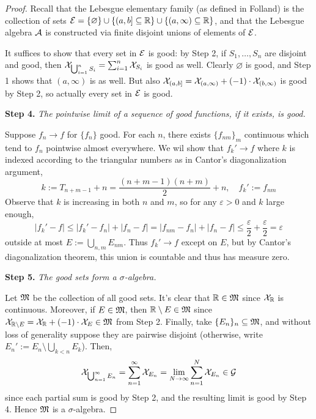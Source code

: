 \begin{proof}
    Recall that the Lebesgue elementary family (as defined in Folland) is the collection of sets \(\mathcal{E} = \{ \varnothing \} \cup \{ (a, b] \subseteq \mathbb{R} \} \cup \{ (a, \infty) \subseteq \mathbb{R} \}\), and that the Lebesgue algebra \(\mathcal{A}\) is constructed via finite disjoint unions of elements of \(\mathcal{E}\). 
    
    It suffices to show that every set in \(\mathcal{E}\) is good: by Step 2, if \(S_1, \dots, S_n\) are disjoint and good, then \(\mathcal{X}_{\bigcup_{i=1}^n S_i} = \sum_{i=1}^n \mathcal{X}_{S_i}\) is good as well. Clearly \(\varnothing\) is good, and Step 1 shows that \((a, \infty)\) is as well. But also \(\mathcal{X}_{(a, b]} = \mathcal{X}_{(a, \infty)} + (-1) \cdot \mathcal{X}_{(b, \infty)}\) is good by Step 2, so actually every set in \(\mathcal{E}\) is good. 

    \textbf{Step 4.} \emph{The pointwise limit of a sequence of good functions, if it exists, is good.}

    Suppose \(f_n \to f\) for \(\{f_n\}\) good. For each \(n\), there exists \(\{f_{nm}\}_m\) continuous which tend to \(f_n\) pointwise almost everywhere. We wil show that \(f_k' \to f\) where \(k\) is indexed according to the triangular numbers as in Cantor's diagonalization argument, 
    \[
    k := T_{n+m-1} + n = \frac{(n+m-1)(n+m)}{2} + n, 
    \quad 
    f_k' := f_{nm}
    \]
    Observe that \(k\) is increasing in both \(n\) and \(m\), so for any \(\varepsilon > 0\) and \(k\) large enough, 
    \[
    |f_k' - f| 
    \leq |f_k' - f_n| + |f_n - f|
    = |f_{nm} - f_n| + |f_n - f|
    \leq \frac{\varepsilon}{2} + \frac{\varepsilon}{2}
    = \varepsilon
    \]
    outside at most \(E := \bigcup_{n,m} E_{nm}\). Thus \(f_k' \to f\) except on \(E\), but by Cantor's diagonalization theorem, this union is countable and thus has measure zero. 

    \textbf{Step 5.} \emph{The good sets form a \(\sigma\)-algebra.}

    Let \(\mathfrak{M}\) be the collection of all good sets. It's clear that \(\mathbb{R} \in \mathfrak{M}\) since \(\mathcal{X}_{\mathbb{R}}\) is continuous. Moreover, if \(E \in \mathfrak{M}\), then \(\mathbb{R} \setminus E \in \mathfrak{M}\) since \(\mathcal{X}_{\mathbb{R} \setminus E} = \mathcal{X}_{\mathbb{R}} + (-1) \cdot \mathcal{X}_E \in \mathfrak{M}\) from Step 2. Finally, take \(\{E_n\}_n \subseteq \mathfrak{M}\), and without loss of generality suppose they are pairwise disjoint (otherwise, write \(E_n' := E_n \setminus \bigcup_{k<n}E_k\)). Then, 
    \[
    \mathcal{X}_{\bigcup_{n=1}^\infty E_n} 
    = \sum_{n=1}^\infty \mathcal{X}_{E_n} 
    = \lim_{N \to \infty} \sum_{n=1}^N \mathcal{X}_{E_n}
    \in \mathcal{G}
    \]
    since each partial sum is good by Step 2, and the resulting limit is good by Step 4. Hence \(\mathfrak{M}\) is a \(\sigma\)-algebra. 


\end{proof}
